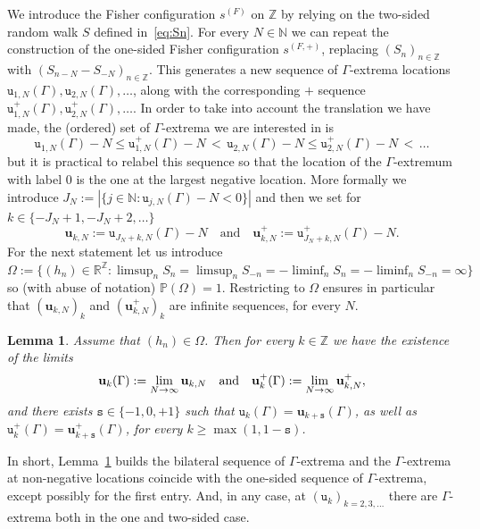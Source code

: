 \documentclass[10pt]{amsart}
\newtheorem{lemm}[theo]{Lemma}\newtheorem{prop}[theo]{Proposition}\newtheorem{coro}[theo]{Corollary}\newtheorem{conj}[theo]{Conjecture}
\theoremstyle{definition}\newtheorem{defi}[theo]{Definition}\newtheorem{rema}[theo]{Remark}\newtheorem{exam}[theo]{Example}\newtheorem{exem}[theo]{Example}\newtheorem{nota}[theo]{Notation}
\newcommand{\bfu}{\mathbf{u}}
\newcommand{\bbN}{\mathbb{N}}
\newcommand{\bbP}{\mathbb{P}}
\newcommand{\bbR}{\mathbb{R}}
\newcommand{\bbZ}{\mathbb{Z}}
\newcommand{\gG}{\Gamma}
\newcommand{\gO}{\Omega}
\renewcommand*\ss{\mathtt{u}}
\newcommand{\tu}{\ss}
\newcommand{\ts}{\mathtt{s}}
\renewcommand*{\to}{\mathchoice{\longrightarrow}{\rightarrow}{\rightarrow}{\rightarrow}}
\begin{document}
We introduce the Fisher configuration $s^{(F)}$ on $\bbZ$ by relying on the two-sided random walk $S$ defined in~\eqref{eq:Sn}. For every $N\in \bbN$ we can repeat the construction of the one-sided Fisher configuration $s^{(F,+)}$, replacing $(S_n)_{n \in \bbZ}$ with $(S_{n-N}-S_{-N})_{n \in \bbZ}$. This generates a new sequence of $\gG$-extrema locations $\tu_{1,N}(\gG), \tu_{2,N}(\gG), \dots$, along with the corresponding $+$ sequence $\tu^+_{1,N}(\gG), \tu^+_{2,N}(\gG), \dots$. In order to take into account the translation we have made, the (ordered) set of $\gG$-extrema we are interested in is
\begin{equation}
\tu_{1,N}(\gG)-N \le \tu^+_{1,N}(\gG)-N\, < \,
\tu_{2,N}(\gG)-N \le \tu^+_{2,N}(\gG)-N\, < \, \dots
\end{equation}
but it is practical to relabel this sequence so that the location of the $\gG$-extremum with label $0$ is the one at the largest negative location. More formally we introduce $J_N:= | \{ j\in \bbN: \tu_{j,N}(\gG)-N < 0 \} |$ and then we set for $k\in \{ -J_N+1, -J_N+2, \dots\}$
\begin{equation}
\bfu_{k, N}:= \tu_{J_N+k,N}(\gG)-N
\quad\text{and}\quad\bfu^+_{k, N}:= \tu^+_{J_N+k,N}(\gG)-N.
\end{equation}
For the next statement let us introduce $\gO\!:=\!\{(h_n)\!\in\! \bbR^\bbZ: \limsup_n S_{n}\!=\!\limsup_n S_{-n} =- \liminf_n S_{n}=- \liminf_n S_{-n}= \infty\}$ so (with abuse of notation) $\bbP(\gO)=1$. Restricting to $\gO$ ensures in particular that $(\bfu_{k, N})_k$ and $(\bfu^+_{k, N})_k$ are infinite sequences, for every $N$.


\begin{lemm}\label{th:N-stability}
Assume that $(h_n) \in \gO$. Then for every $k\in \bbZ$ we have the existence of the limits
\begin{equation}\label{eq:N-stability-existence}
\bfu_{k}(\gG) :=
\lim_{N \to \infty} \bfu_{k, N}
\quad\text{and}\quad \bfu^+_{k} (\gG) := \lim_{N \to \infty} \bfu^+_{k, N},
\end{equation}
and there exists $\ts\in \{-1, 0, +1\}$ such that $\tu_k(\gG)= \bfu_{k+\ts}(\gG)$, as well as $\tu^+_k(\gG)= \bfu^+_{k+\ts}(\gG)$, for every $k\ge \max(1, 1-\ts)$.
\end{lemm}

In short, Lemma~\ref{th:N-stability} builds the bilateral sequence of $\gG$-extrema and the $\gG$-extrema at non-negative locations coincide with the one-sided sequence of $\gG$-extrema, except possibly for the first entry. And, in any case, at $(\tu_k)_{k=2,3, \dots}$ there are $\gG$-extrema both in the one and two-sided case.
\end{document}
